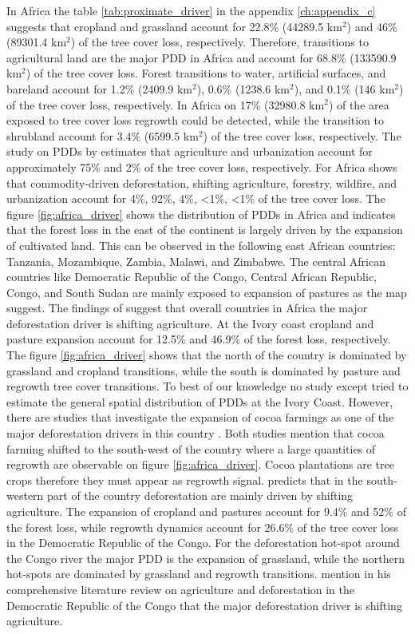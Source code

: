 			In Africa the table \ref{tab:proximate_driver} in the appendix \ref{ch:appendix_c} suggests that cropland and grassland account for 22.8\% (44289.5 km$^2$) and 46\% (89301.4 km$^2$) of the tree cover loss, respectively. Therefore, transitions to agricultural land are the major \ac{PDD} in Africa and account for 68.8\% (133590.9 km$^2$) of the tree cover loss. Forest transitions to water, artificial surfaces, and bareland account for 1.2\% (2409.9 km$^2$), 0.6\% (1238.6 km$^2$), and 0.1\% (146 km$^2$) of the tree cover loss, respectively. In Africa on 17\% (32980.8 km$^2$) of the area exposed to tree cover loss regrowth could be detected, while the transition to shrubland account for 3.4\% (6599.5 km$^2$) of the tree cover loss, respectively. The study on \acp{PDD} by \citet{Hosonuma2012} estimates that agriculture and urbanization account for approximately 75\% and 2\% of the tree cover loss, respectively. For Africa \citet{Curtis2018} shows that commodity-driven deforestation, shifting agriculture, forestry, wildfire, and urbanization account for 4\%, 92\%, 4\%, <1\%, <1\% of the tree cover loss. The figure \ref{fig:africa_driver} shows the distribution of \acp{PDD} in Africa and indicates that the forest loss in the east of the continent is largely driven by the expansion of cultivated land. This can be observed in the following east African countries: Tanzania, Mozambique, Zambia, Malawi, and Zimbabwe. The central African countries like Democratic Republic of the Congo, Central African Republic, Congo, and South Sudan are mainly exposed to expansion of pastures as the map suggest. The findings of \citeauthor{Curtis2018} suggest that overall countries in Africa the major deforestation driver is shifting agriculture. At the Ivory coast cropland and pasture expansion account for 12.5\% and 46.9\% of the forest loss, respectively. The figure \ref{fig:africa_driver} shows that the north of the country is dominated by grassland and cropland transitions, while the south is dominated by pasture and regrowth tree cover transitions. To best of our knowledge no study except \citeauthor{Curtis2018} tried to estimate the general spatial distribution of \acp{PDD} at the Ivory Coast. However, there are studies that investigate the expansion of cocoa farmings as one of the major deforestation drivers in this country \citep{Barima2016,Ruf2014}. Both studies mention that cocoa farming shifted to the south-west of the country where a large quantities of regrowth are observable on figure \ref{fig:africa_driver}. Cocoa plantations are tree crops therefore they must appear as regrowth signal. \citet{Curtis2018} predicts that in the south-western part of the country deforestation are mainly driven by shifting agriculture. The expansion of cropland and pastures account for 9.4\% and 52\% of the forest loss, while regrowth dynamics account for 26.6\% of the tree cover loss in the Democratic Republic of the Congo. For the deforestation hot-spot around the Congo river the major \ac{PDD} is the expansion of grassland, while the northern hot-spots are dominated by grassland and regrowth transitions. \citet{Ickowitz2015} mention in his comprehensive literature review on agriculture and deforestation in the Democratic Republic of the Congo that the major deforestation driver is shifting agriculture. 